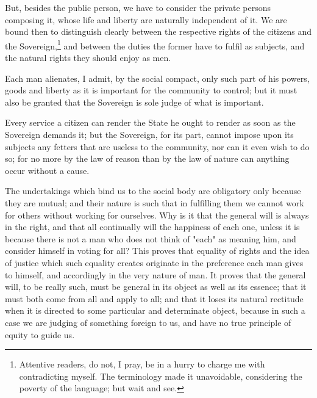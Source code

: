 \documentclass[12pt]{book}
\begin{document}
But, besides the public person, we have to consider the private persons composing it, whose life and liberty are naturally independent of it. We are bound then to distinguish clearly between the respective rights of the citizens and the Sovereign,\footnote{Attentive readers, do not, I pray, be in a hurry to charge me with contradicting myself. The terminology made it unavoidable, considering the poverty of the language; but wait and see.} and between the duties the former have to fulfil as subjects, and the natural rights they should enjoy as men.

Each man alienates, I admit, by the social compact, only such part of his powers, goods and liberty as it is important for the community to control; but it must also be granted that the Sovereign is sole judge of what is important.

Every service a citizen can render the State he ought to render as soon as the Sovereign demands it; but the Sovereign, for its part, cannot impose upon its subjects any fetters that are useless to the community, nor can it even wish to do so; for no more by the law of reason than by the law of nature can anything occur without a cause.

The undertakings which bind us to the social body are obligatory only because they are mutual; and their nature is such that in fulfilling them we cannot work for others without working for ourselves. Why is it that the general will is always in the right, and that all continually will the happiness of each one, unless it is because there is not a man who does not think of "each" as meaning him, and consider himself in voting for all? This proves that equality of rights and the idea of justice which such equality creates originate in the preference each man gives to himself, and accordingly in the very nature of man. It proves that the general will, to be really such, must be general in its object as well as its essence; that it must both come from all and apply to all; and that it loses its natural rectitude when it is directed to some particular and determinate object, because in such a case we are judging of something foreign to us, and have no true principle of equity to guide us.
\end{document}

